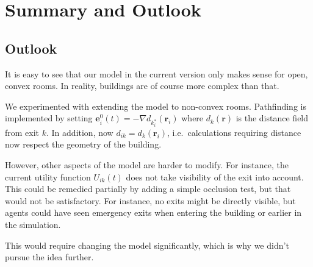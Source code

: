 \section{Summary and Outlook}

\subsection{Outlook}
It is easy to see that our model in the current version only makes sense for
open, convex rooms. In reality, buildings are of course more complex than that.

We experimented with extending the model to non-convex rooms. Pathfinding is implemented by setting $\bm{e}_i^0(t) = -\nabla d_{k_i^*}(\bm{r}_i)$ where $d_k(\bm{r})$ is the distance field from exit $k$. In addition, now $d_{ik} = d_k(\bm{r}_i)$, i.e.\ calculations requiring distance now respect the geometry of the building.

However, other aspects of the model are harder to modify. For instance, the current utility function $U_{ik}(t)$ does not take visibility of the exit into account. This could be remedied partially by adding a simple occlusion test, but that would not be satisfactory. For instance, no exits might be directly visible, but agents could have seen emergency exits when entering the building or earlier in the simulation.

This would require changing the model significantly, which is why we didn't pursue the idea further.
